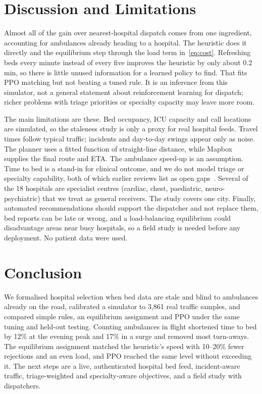 \documentclass[conference]{IEEEtran}
\begin{document}
\section{Discussion and Limitations}
Almost all of the gain over nearest-hospital dispatch comes from one ingredient, accounting for ambulances already heading to a hospital. The heuristic does it directly and the equilibrium step through the load term in~\eqref{eq:cost}. Refreshing beds every minute instead of every five improves the heuristic by only about 0.2 min, so there is little unused information for a learned policy to find. That fits PPO matching but not beating a tuned rule. It is an inference from this simulator, not a general statement about reinforcement learning for dispatch; richer problems with triage priorities or specialty capacity may leave more room.

The main limitations are these. Bed occupancy, ICU capacity and call locations are simulated, so the staleness study is only a proxy for real hospital feeds. Travel times follow typical traffic; incidents and day-to-day swings appear only as noise. The planner uses a fitted function of straight-line distance, while Mapbox supplies the final route and ETA. The ambulance speed-up is an assumption. Time to bed is a stand-in for clinical outcome, and we do not model triage or specialty capability, both of which earlier reviews list as open gaps~\cite{bajwa2025ai,tluli2024survey}. Several of the 18 hospitals are specialist centres (cardiac, chest, paediatric, neuro-psychiatric) that we treat as general receivers. The study covers one city. Finally, automated recommendations should support the dispatcher and not replace them, bed reports can be late or wrong, and a load-balancing equilibrium could disadvantage areas near busy hospitals, so a field study is needed before any deployment. No patient data were used.

\section{Conclusion}
We formalised hospital selection when bed data are stale and blind to ambulances already on the road, calibrated a simulator to 3,861 real traffic samples, and compared simple rules, an equilibrium assignment and PPO under the same tuning and held-out testing. Counting ambulances in flight shortened time to bed by 12\% at the evening peak and 17\% in a surge and removed most turn-aways. The equilibrium assignment matched the heuristic's speed with 10--20\% fewer rejections and an even load, and PPO reached the same level without exceeding it. The next steps are a live, authenticated hospital bed feed, incident-aware traffic, triage-weighted and specialty-aware objectives, and a field study with dispatchers.
\end{document}
